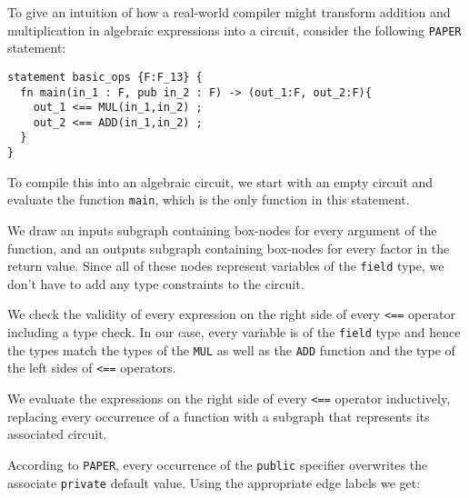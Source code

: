 \begin{example} To give an intuition of how a real-world compiler might transform addition and multiplication in algebraic expressions into a circuit, consider the following \texttt{PAPER} statement:
\begin{lstlisting}
statement basic_ops {F:F_13} {
  fn main(in_1 : F, pub in_2 : F) -> (out_1:F, out_2:F){
    out_1 <== MUL(in_1,in_2) ;
    out_2 <== ADD(in_1,in_2) ;
  }
}
\end{lstlisting} 
To compile this into an algebraic circuit, we start with an empty circuit and evaluate the function \texttt{main}, which is the only function in this statement. 

We draw an inputs subgraph containing box-nodes for every argument of the function, and an outputs subgraph containing box-nodes for every factor in the return value. Since all of these nodes represent variables of the \texttt{field} type, we don't have to add any type constraints to the circuit.

We check the validity of every expression on the right side of every \texttt{<==} operator including a type check. In our case, every variable is of the \texttt{field} type and hence the types match the types of the \texttt{MUL} as well as the \texttt{ADD} function and the type of the left sides of \texttt{<==} operators. 

We evaluate the expressions on the right side of every \texttt{<==} operator inductively, replacing every occurrence of a function with a subgraph that represents its associated circuit.

According to \texttt{PAPER}, every occurrence of the \texttt{public} specifier overwrites the associate \texttt{private} default value. Using the appropriate edge labels we get: 
\begin{center}
\end{center}
\end{example}
